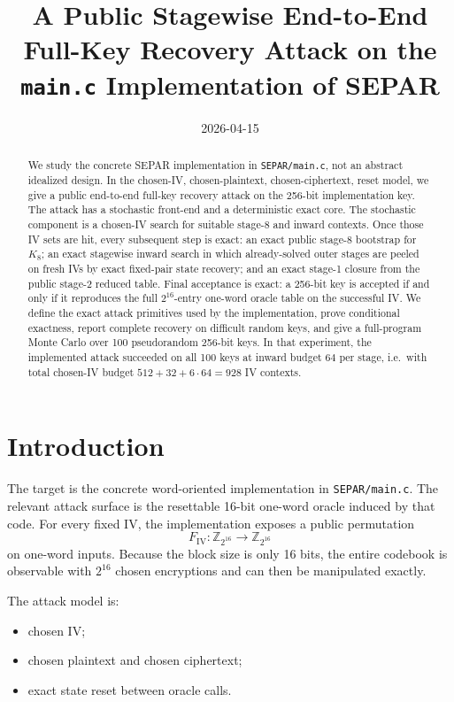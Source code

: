\documentclass[11pt]{article}
\title{A Public Stagewise End-to-End Full-Key Recovery Attack on the \texttt{main.c} Implementation of SEPAR}
\author{}
\date{2026-04-15}
\newcommand{\Z}[1]{\mathbb{Z}_{#1}}
\begin{document}
\maketitle

\begin{abstract}
We study the concrete SEPAR implementation in \texttt{SEPAR/main.c}, not an abstract idealized design. In the chosen-IV, chosen-plaintext, chosen-ciphertext, reset model, we give a public end-to-end full-key recovery attack on the 256-bit implementation key. The attack has a stochastic front-end and a deterministic exact core. The stochastic component is a chosen-IV search for suitable stage-8 and inward contexts. Once those IV sets are hit, every subsequent step is exact: an exact public stage-8 bootstrap for $K_8$; an exact stagewise inward search in which already-solved outer stages are peeled on fresh IVs by exact fixed-pair state recovery; and an exact stage-1 closure from the public stage-2 reduced table. Final acceptance is exact: a 256-bit key is accepted if and only if it reproduces the full $2^{16}$-entry one-word oracle table on the successful IV. We define the exact attack primitives used by the implementation, prove conditional exactness, report complete recovery on difficult random keys, and give a full-program Monte Carlo over 100 pseudorandom 256-bit keys. In that experiment, the implemented attack succeeded on all 100 keys at inward budget $64$ per stage, i.e.\ with total chosen-IV budget $512+32+6\cdot 64=928$ IV contexts.
\end{abstract}

\section{Introduction}
The target is the concrete word-oriented implementation in \texttt{SEPAR/main.c}. The relevant attack surface is the resettable 16-bit one-word oracle induced by that code. For every fixed IV, the implementation exposes a public permutation
\[
F_{\mathrm{IV}}:\Z{2^{16}}\to\Z{2^{16}}
\]
on one-word inputs. Because the block size is only 16 bits, the entire codebook is observable with $2^{16}$ chosen encryptions and can then be manipulated exactly.

The attack model is:
\begin{itemize}[leftmargin=1.5em]
\item chosen IV;
\item chosen plaintext and chosen ciphertext;
\item exact state reset between oracle calls.
\end{itemize}
\end{document}
